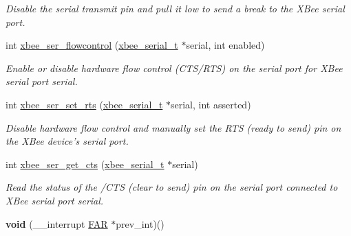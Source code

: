 \begin{DoxyCompactItemize}
\begin{DoxyCompactList}\small\item\em Disable the serial transmit pin and pull it low to send a break to the X\-Bee serial port. \end{DoxyCompactList}\item 
int \hyperlink{group__hal__dos_ga1f5f72ffdfbfb45ac523640db32296ff}{xbee\-\_\-ser\-\_\-flowcontrol} (\hyperlink{structxbee__serial__t}{xbee\-\_\-serial\-\_\-t} $\ast$serial, int enabled)
\begin{DoxyCompactList}\small\item\em Enable or disable hardware flow control (C\-T\-S/\-R\-T\-S) on the serial port for X\-Bee serial port {\itshape serial}. \end{DoxyCompactList}\item 
int \hyperlink{group__hal__dos_ga731188d8cf41d3d749bc84d51b672535}{xbee\-\_\-ser\-\_\-set\-\_\-rts} (\hyperlink{structxbee__serial__t}{xbee\-\_\-serial\-\_\-t} $\ast$serial, int asserted)
\begin{DoxyCompactList}\small\item\em Disable hardware flow control and manually set the R\-T\-S (ready to send) pin on the X\-Bee device's serial port. \end{DoxyCompactList}\item 
int \hyperlink{group__hal__dos_ga894f6fadc890b5ba5ce32338f0acd217}{xbee\-\_\-ser\-\_\-get\-\_\-cts} (\hyperlink{structxbee__serial__t}{xbee\-\_\-serial\-\_\-t} $\ast$serial)
\begin{DoxyCompactList}\small\item\em Read the status of the /\-C\-T\-S (clear to send) pin on the serial port connected to X\-Bee serial port {\itshape serial}. \end{DoxyCompactList}\item 
\hypertarget{group__hal__dos_ga475b2e273ce4aad9558201d41b6f4459}{{\bfseries void} (\-\_\-\-\_\-interrupt \hyperlink{group__hal_gaef060b3456fdcc093a7210a762d5f2ed}{F\-A\-R} $\ast$prev\-\_\-int)()}\label{group__hal__dos_ga475b2e273ce4aad9558201d41b6f4459}

\end{DoxyCompactItemize}
